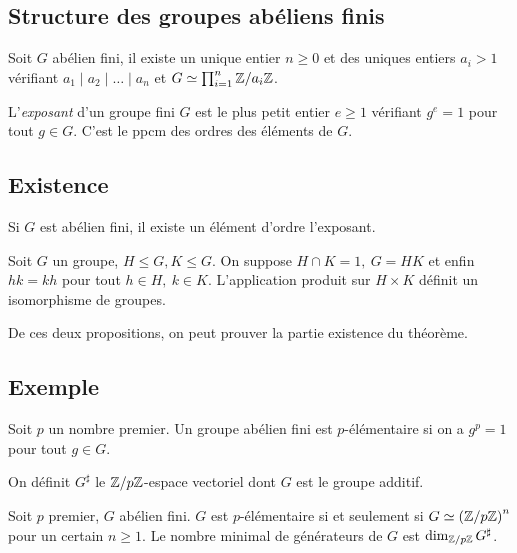 \documentclass{cours}
\begin{document}
\subsection{Structure des groupes abéliens finis}
\begin{theorem}\label{structuregrpabelfinis}
    Soit $G$ abélien fini, il existe un unique entier $n\geq 0$ et des uniques entiers $a_{i} > 1$ vérifiant $a_{1} \mid a_{2} \mid \ldots \mid a_{n}$ et $G \simeq \prod_{i=1}^{n} \mathbb{Z}/a_{i}\mathbb{Z}$.
\end{theorem}

\begin{definition}
    L'\emph{exposant} d'un groupe fini $G$ est le plus petit entier $e \geq 1$ vérifiant $g^{e} = 1$ pour tout $g \in G$. C'est le ppcm des ordres des éléments de $G$. 
\end{definition}

\subsection{Existence}
\begin{lemma}
    Si $G$ est abélien fini, il existe un élément d'ordre l'exposant. 
\end{lemma}

\begin{proposition}
    Soit $G$ un groupe, $H\leq G, K \leq G$. On suppose $H \cap K = 1, \ G = HK$ et enfin $hk = kh$ pour tout $h \in H,\ k \in K$. L'application produit sur $H \times K$ définit un isomorphisme de groupes. 
\end{proposition}

De ces deux propositions, on peut prouver la partie existence du théorème. 

\subsection{Exemple}
\begin{definition}
    Soit $p$ un nombre premier. Un groupe abélien fini est $p$-élémentaire si on a $g^{p} = 1$ pour tout $g \in G$.
\end{definition}

\begin{definition}
    On définit $G^{\sharp}$ le $\mathbb{Z}/p\mathbb{Z}$-espace vectoriel dont $G$ est le groupe additif. 
\end{definition}

\begin{proposition}
    Soit $p$ premier, $G$ abélien fini. $G$ est $p$-élémentaire si et seulement si $G \simeq \left(\mathbb{Z}/p\mathbb{Z}\right)^{n}$ pour un certain $n \geq 1$. Le nombre minimal de générateurs de $G$ est $\dim_{\mathbb{Z}/p\mathbb{Z}}G^{\sharp}$.
\end{proposition}
\end{document}
